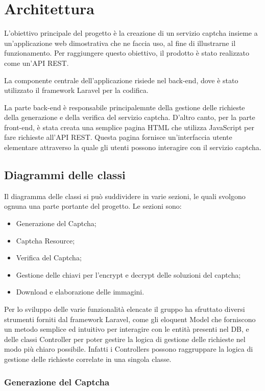 \section{Architettura}
L'obiettivo principale del progetto è la creazione di un servizio captcha insieme a un'applicazione web 
dimostrativa che ne faccia uso, al fine di illustrarne il funzionamento. Per raggiungere questo obiettivo, 
il prodotto è stato realizzato come un'API REST.

La componente centrale dell'applicazione risiede nel back-end, dove è stato utilizzato il framework Laravel 
per la codifica.

La parte back-end è responsabile principalemnte della gestione delle richieste della generazione e della verifica del servizio captcha. 
D'altro canto, per la parte front-end, è stata creata una semplice pagina HTML che utilizza JavaScript per fare 
richieste all'API REST. Questa pagina fornisce un'interfaccia utente elementare attraverso la quale gli utenti possono 
interagire con il servizio captcha.

\subsection{Diagrammi delle classi}

Il diagramma delle classi si può suddividere in varie sezioni, le quali svolgono ognuna una parte portante del progetto. Le sezioni sono:
\begin{itemize}
    \item Generazione del Captcha;
    \item Captcha Resource;
    \item Verifica del Captcha;
    \item Gestione delle chiavi per l'encrypt e decrypt delle soluzioni del captcha;
    \item Download e elaborazione delle immagini.
\end{itemize}

Per lo sviluppo delle varie funzionalità elencate il gruppo ha sfruttato diversi strumenti forniti dal framework Laravel, 
come gli eloquent Model che forniscono un metodo semplice ed intuitivo per interagire con le entità presenti nel DB, e delle classi 
Controller per poter gestire la logica di gestione delle richieste nel modo più chiaro possibile. Infatti i Controllers possono 
raggruppare la logica di gestione delle richieste correlate in una singola classe.

\subsubsection{Generazione del Captcha}

